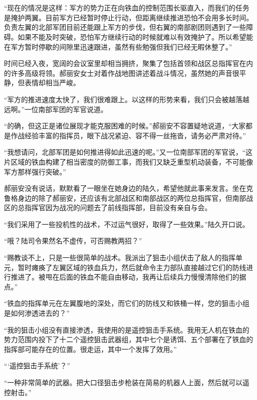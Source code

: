 \section*{}

“现在的情况是这样：军方的势力正在向铁血的控制范围长驱直入，而我们的任务是掩护两翼。目前军方已经暂时停止行动，但距离继续推进恐怕不会用多长时间。负责左翼的北部军团目前还能跟上军方的步伐，但右翼的南部剧团则遇到了一些障碍。如果不能及时突破，恐怕军方继续行动的时候就难以有效掩护了。所以希望能在军方暂时停歇的间隙里迅速跟进，虽然有些勉强但我们已经无暇休整了。”

时间已经入夜，宽阔的会议室里却相当拥挤，聚集了包括首领和战区总指挥官在内的许多高级将领。郝丽安女士对着作战地图讲述着战斗情况，虽然她的声音很平静，但表情却相当严峻。

“军方的推进速度太快了，我们很难跟上。以这样的形势来看，我们只会被越落越远啊。”一位南部军团的军官说道。

“的确，但这正是诸位展现才能克服困难的时候。”郝丽安不容置疑地说道，“大家都是作战经验丰富的指挥员，眼下战况紧迫、容不得一丝拖沓，请务必严肃对待。”

“我想请问，北部军团是如何推进得如此迅速的呢。”又一位南部军团的军官说，“这片区域的铁血构建了相当密度的防御工事，而我们又缺乏重型机动装备，不可能像军方那样强行突破。”

郝丽安没有说话，默默看了一眼坐在她身边的陆久，希望他就此事来发言。坐在克鲁格身边的除了郝丽安，还应该有北部战区和南部战区的两位总指挥官，但南部战区的总指挥官因为战况的问题去了前线指挥部，目前没有亲自与会。

“我们采用了一些投机性的战术，不过运气很好，取得了一些效果。”陆久开口说。

“哦？陆司令果然名不虚传，可否赐教两招？”

“赐教谈不上，只是一些很简单的战术。我派出了狙击小组伏击了敌人的指挥单元，暂时瘫痪了左翼区域的铁血兵力，然后就命令主力部队直接越过它们的防线进行推进了。被甩在后面的铁血不能自由移动，我再让后续兵力慢慢清除他们的据点。”

“铁血的指挥单元在左翼腹地的深处，而它们的防线又和铁桶一样，您的狙击小组是如何渗透进去的？”

“我的狙击小组没有直接渗透，我使用的是遥控狙击手系统。我用无人机在铁血的势力范围内投下了十二个遥控狙击武器组，其中七个是诱饵、五个部署在了铁血的指挥部可能存在的位置。很走运，其中一个发挥了效用。”

“‘遥控狙击手系统’？”

“一种非常简单的武器。把大口径狙击步枪装在简易的机器人上面，然后就可以遥控射击。”

